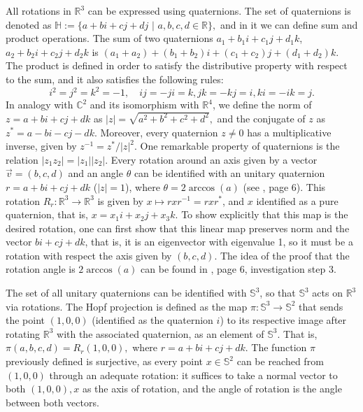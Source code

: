 \documentclass[12pt, letterpaper, reqno]{amsart}
\theoremstyle{definition}
\theoremstyle{plain}
\theoremstyle{remark}
\begin{document}
All rotations in $ \mathbb{R}^3 $ can be expressed using quaternions. The set of quaternions is denoted as $ \mathbb{H} := \{ a+bi+cj+dj$  $|$  $a,b,c,d\in \mathbb{R} \}, $ and in it we can define sum and product operations. The sum of two quaternions $ a_1+b_1 i +c_1 j  + d_1k $, $ a_2+b_2 i +c_2 j  + d_2k $ is $ (a_1+a_2)+(b_1+b_2)i+(c_1+c_2)j+(d_1+d_2)k. $ The product is defined in order to satisfy the distributive property with respect to the sum, and it also satisfies the following rules: 
$$ i^2=j^2=k^2=-1, \quad ij=-ji=k, jk=-kj=i, ki = -ik=j.  $$ 
In analogy with $\mathbb{C}^2$ and its isomorphism with $\mathbb{R}^4$, we define the norm of $ z= a+bi+cj+dk $ as $ |z|=\sqrt{a^2+b^2+c^2+d^2}, $ and the conjugate of $ z $ as $ z^* = a-bi-cj-dk. $ Moreover, every quaternion $ z\neq 0 $ has a multiplicative inverse, given by $ z^{-1} = z^*/|z|^2. $ One remarkable property of quaternions is the relation $ |z_1 z_2| = |z_1||z_2|. $  Every rotation around an axis given by a vector $ \vec{v}=(b,c,d) $ and an angle $ \theta $ can be identified with an unitary quaternion $r = a+bi+cj+dk$ ($|z|=1$),  where $ \theta = 2\arccos(a) $ (see \cite{lyons2003elementary}, page 6). This rotation $ R_r: \mathbb{R}^3 \rightarrow\mathbb{R}^3 $ is given by $ x\mapsto rxr^{-1}= rxr^*$, and $ x $ identified as a pure quaternion, that is, $ x=x_1i+x_2j+x_3k. $ To show explicitly that this map is the desired rotation, one can first show that this linear map preserves norm and the vector $ bi+cj+dk $, that is, it is an eigenvector with eigenvalue 1, so it must be a rotation with respect the axis given by $ (b,c,d) $. The idea of the proof that the rotation angle is $ 2\arccos(a) $ can be found in \cite{lyons2003elementary}, page 6, investigation step 3. 

The set of all unitary quaternions can be identified with $ \mathbb{S}^3 $, so that $ \mathbb{S}^3 $ acts on $ \mathbb{R}^3 $ via rotations. The Hopf projection is defined as the map $ \pi: \mathbb{S}^3 \rightarrow \mathbb{S}^2 $ that sends the point $ (1,0,0) $ (identified as the quaternion $ i $)   to its respective image after rotating $ \mathbb{R}^3 $ with the associated quaternion, as an element of $ \mathbb{S}^3 $. That is, $ \pi(a,b,c,d) = R_r(1,0,0), $ where $ r=a+bi+cj+dk. $  The function $ \pi $ previously defined is surjective, as every point $ x\in\mathbb{S}^2 $ can be reached from $ (1,0,0) $ through an adequate rotation: it suffices to take a normal vector to both $ (1,0,0), x $ as the axis of rotation, and the angle of rotation is the angle between both vectors. 
\end{document}

